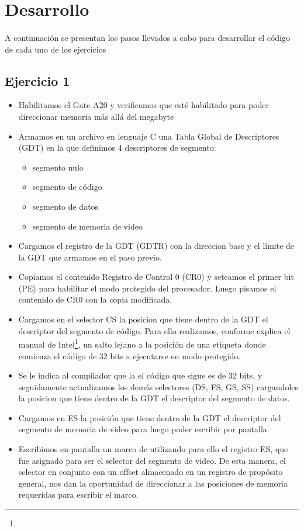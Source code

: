 \section{Desarrollo}
\paragraph{}
A continuaci\'on se presentan los pasos llevados a cabo para desarrollar el c\'odigo de cada uno de los ejercicios

\subsection{Ejercicio 1}
\begin{itemize}
 \item Habilitamos el Gate A20 y verificamos que est\'e habilitado para poder direccionar memoria m\'as all\'a del megabyte
 \item Armamos en un archivo en lenguaje C una Tabla Global de Descriptores (GDT) en la que definimos 4 descriptores de segmento: 
	\begin{itemize}
	\item segmento nulo
	\item segmento de c\'odigo
	\item segmento de datos
	\item segmento de memoria de video
	\end{itemize}

 \item Cargamos el registro de la GDT (GDTR) con la direccion base  y el l\'imite de la GDT que armamos en el paso previo.

 \item Copiamos el contenido Registro de Control 0 (CR0) y seteamos el primer bit (PE) para habilitar el modo protegido del procesador. Luego pisamos el contenido de CR0 con la copia modificada.

 \item Cargamos en el selector CS la posicion que tiene dentro de la GDT el descriptor del segmento de c\'odigo. Para ello realizamos, conforme explica el manual de Intel\footnote{}, un salto lejano a la posici\'on de una etiqueta donde comienza el c\'odigo de 32 bits a ejecutarse en modo protegido.

 \item Se le indica al compilador que la el c\'odigo que sigue es de 32 bits, y seguidamente actualizamos los dem\'as selectores (DS, FS, GS, SS) cargandoles la posicion que tiene dentro de la GDT el descriptor del segmento de datos.

 \item Cargamos en ES la posici\'on que tiene dentro de la GDT el descriptor del segmento de memoria de video para luego poder escribir por pantalla.
 
 \item Escribimos en pantalla un marco de \* utilizando para ello el registro ES, que fue asignado para ser el selector del segmento de video. De esta manera, el selector en conjunto con un offset almacenado en un registro de prop\'osito general, nos dan la oportunidad de direccionar a las posiciones de memoria requeridas para escribir el marco.
\end{itemize}
